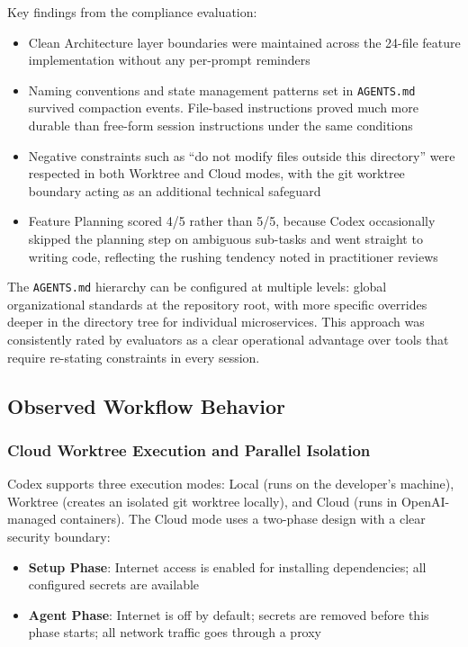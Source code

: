 \documentclass[conference]{IEEEtran}
\begin{document}
Key findings from the compliance evaluation:
\begin{itemize}
    \item Clean Architecture layer boundaries were maintained across the 24-file feature implementation without any per-prompt reminders
    \item Naming conventions and state management patterns set in \texttt{AGENTS.md} survived compaction events. File-based instructions proved much more durable than free-form session instructions under the same conditions
    \item Negative constraints such as ``do not modify files outside this directory'' were respected in both Worktree and Cloud modes, with the git worktree boundary acting as an additional technical safeguard
    \item Feature Planning scored 4/5 rather than 5/5, because Codex occasionally skipped the planning step on ambiguous sub-tasks and went straight to writing code, reflecting the rushing tendency noted in practitioner reviews \cite{wiegold2026}
\end{itemize}

The \texttt{AGENTS.md} hierarchy can be configured at multiple levels: global organizational standards at the repository root, with more specific overrides deeper in the directory tree for individual microservices. This approach was consistently rated by evaluators as a clear operational advantage over tools that require re-stating constraints in every session.

\subsection{Observed Workflow Behavior}

\subsubsection{Cloud Worktree Execution and Parallel Isolation}
Codex supports three execution modes: Local (runs on the developer's machine), Worktree (creates an isolated git worktree locally), and Cloud (runs in OpenAI-managed containers). The Cloud mode uses a two-phase design with a clear security boundary:
\begin{itemize}
    \item \textbf{Setup Phase}: Internet access is enabled for installing dependencies; all configured secrets are available
    \item \textbf{Agent Phase}: Internet is off by default; secrets are removed before this phase starts; all network traffic goes through a proxy
\end{itemize}
\end{document}
